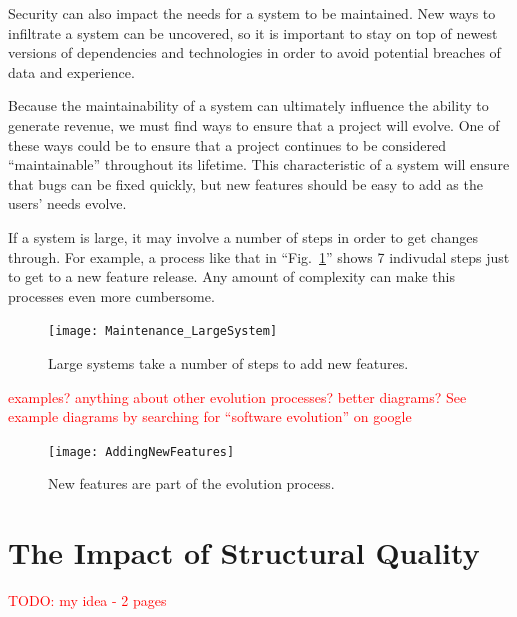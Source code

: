 \documentclass[12pt,conference]{IEEEtran}
\newcommand\todo[1]{\textcolor{red}{#1}}
\begin{document}
Security can also impact the needs for a system to be maintained. New ways to infiltrate a system can be uncovered, so it is important to stay on top of newest versions of dependencies and technologies in order to avoid potential breaches of data and experience.


Because the maintainability of a system can ultimately influence the ability to generate revenue, we must find ways to ensure that a project will evolve. One of these ways could be to ensure that a project continues to be considered ``maintainable'' throughout its lifetime. This characteristic of a system will ensure that bugs can be fixed quickly, but new features should be easy to add as the users' needs evolve.

If a system is large, it may involve a number of steps in order to get changes through. For example, a process like that in ``Fig.~\ref{figLargeSystemMaintenance}'' shows 7 indivudal steps just to get to a new feature release. Any amount of complexity can make this processes even more cumbersome.

\begin{figure}[ht]
    \centerline{
        \texttt{[image: Maintenance\_LargeSystem]}
    }
    \caption{Large systems take a number of steps to add new features.}
    \label{figLargeSystemMaintenance}
\end{figure}

\todo{examples? anything about other evolution processes? better diagrams?}
\todo{See example diagrams by searching for ``software evolution'' on google}

\begin{figure}[ht]
    \centerline{
        \texttt{[image: AddingNewFeatures]}
    }
    \caption{New features are part of the evolution process.}
    \label{figAddingNewFeatures}
\end{figure}


\section{The Impact of Structural Quality}
\todo{TODO: my idea - 2 pages}


\end{document}
